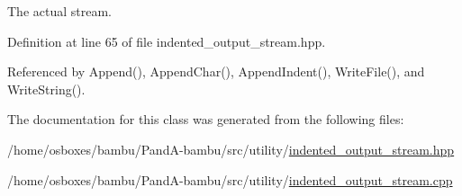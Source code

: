 The actual stream. 



Definition at line 65 of file indented\+\_\+output\+\_\+stream.\+hpp.



Referenced by Append(), Append\+Char(), Append\+Indent(), Write\+File(), and Write\+String().



The documentation for this class was generated from the following files\+:\begin{DoxyCompactItemize}
\item 
/home/osboxes/bambu/\+Pand\+A-\/bambu/src/utility/\hyperlink{indented__output__stream_8hpp}{indented\+\_\+output\+\_\+stream.\+hpp}\item 
/home/osboxes/bambu/\+Pand\+A-\/bambu/src/utility/\hyperlink{indented__output__stream_8cpp}{indented\+\_\+output\+\_\+stream.\+cpp}\end{DoxyCompactItemize}
